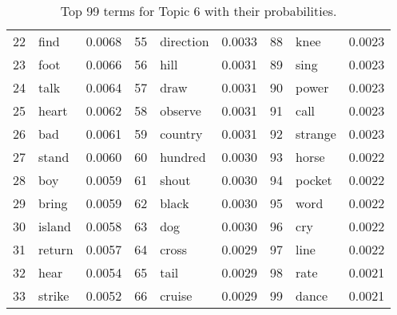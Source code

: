 \begin{table}[ht]
\begin{tabular}{rlrrlrrlr}
  22 & find & 0.0068 & 55 & direction & 0.0033 & 88 & knee & 0.0023 \\ 
  23 & foot & 0.0066 & 56 & hill & 0.0031 & 89 & sing & 0.0023 \\ 
  24 & talk & 0.0064 & 57 & draw & 0.0031 & 90 & power & 0.0023 \\ 
  25 & heart & 0.0062 & 58 & observe & 0.0031 & 91 & call & 0.0023 \\ 
  26 & bad & 0.0061 & 59 & country & 0.0031 & 92 & strange & 0.0023 \\ 
  27 & stand & 0.0060 & 60 & hundred & 0.0030 & 93 & horse & 0.0022 \\ 
  28 & boy & 0.0059 & 61 & shout & 0.0030 & 94 & pocket & 0.0022 \\ 
  29 & bring & 0.0059 & 62 & black & 0.0030 & 95 & word & 0.0022 \\ 
  30 & island & 0.0058 & 63 & dog & 0.0030 & 96 & cry & 0.0022 \\ 
  31 & return & 0.0057 & 64 & cross & 0.0029 & 97 & line & 0.0022 \\ 
  32 & hear & 0.0054 & 65 & tail & 0.0029 & 98 & rate & 0.0021 \\ 
  33 & strike & 0.0052 & 66 & cruise & 0.0029 & 99 & dance & 0.0021 \\ 
   \hline
\end{tabular}
\caption{\small{ Top 99 terms for Topic 6 with their probabilities.}} 
\label{topic_6_terms}
\end{table}
